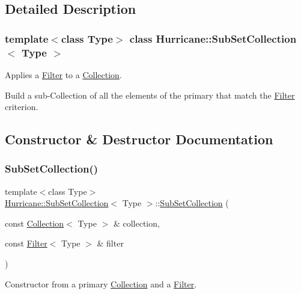 \subsection{Detailed Description}
\subsubsection*{template$<$class Type$>$\newline
class Hurricane\+::\+Sub\+Set\+Collection$<$ Type $>$}

Applies a \hyperlink{classHurricane_1_1Filter}{Filter} to a \hyperlink{classHurricane_1_1Collection}{Collection}. 

Build a sub-\/\+Collection of all the elements of the primary that match the \hyperlink{classHurricane_1_1Filter}{Filter} criterion. 

\subsection{Constructor \& Destructor Documentation}
\mbox{\label{classHurricane_1_1SubSetCollection_a6da1f511e27351cdc8b56bda7fbc44e8}} 
\subsubsection{\texorpdfstring{Sub\+Set\+Collection()}{SubSetCollection()}\hspace{0.1cm}{\footnotesize\ttfamily [1/2]}}
{\footnotesize\ttfamily template$<$class Type$>$ \\
\hyperlink{classHurricane_1_1SubSetCollection}{Hurricane\+::\+Sub\+Set\+Collection}$<$ Type $>$\+::\hyperlink{classHurricane_1_1SubSetCollection}{Sub\+Set\+Collection} (\begin{DoxyParamCaption}\item[{const \hyperlink{classHurricane_1_1Collection}{Collection}$<$ Type $>$ \&}]{collection,  }\item[{const \hyperlink{classHurricane_1_1Filter}{Filter}$<$ Type $>$ \&}]{filter }\end{DoxyParamCaption})\hspace{0.3cm}{\ttfamily [inline]}}

Constructor from a primary \hyperlink{classHurricane_1_1Collection}{Collection} and a \hyperlink{classHurricane_1_1Filter}{Filter}. \mbox{\label{classHurricane_1_1SubSetCollection_ad4e0bd9554d898f3991585758dbf2aac}} 
